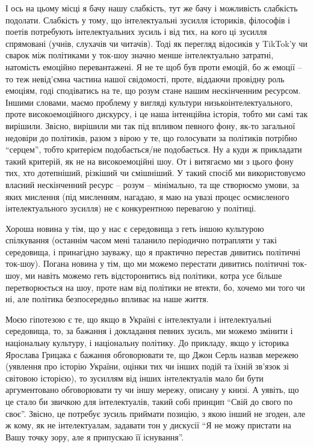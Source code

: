 І ось на цьому місці я бачу нашу слабкість, тут же бачу і можливість слабкість
подолати. Слабкість у тому, що інтелектуальні зусилля істориків, філософів і
поетів потребують інтелектуальних зусиль і від тих, на кого ці зусилля
спрямовані (учнів, слухачів чи читачів). Тоді як перегляд відосиків у TikTok'у
чи сварок між політиками у ток-шоу значно менше інтелектуально затратні,
натомість емоційно перевантажені. Я не те щоб був проти емоцій, бо ж емоції –
то теж невід’ємна частина нашої свідомості, проте, віддаючи провідну роль
емоціям, годі сподіватись на те, що розум стане нашим нескінченним ресурсом.
Іншими словами, маємо проблему у вигляді культури низькоінтелектуального, проте
високоемоційного дискурсу, і це наша інтенційна історія, тобто ми самі так
вирішили. Звісно, вирішили ми так під впливом певного фону, як-то загальної
недовіри до політиків, разом з вірою у те, що голосувати за політиків потрібно
\enquote{серцем}, тобто критерієм подобається/не подобається. Ну а куди ж прикладати
такий критерій, як не на високоемоційні шоу. От і витягаємо ми з цього фону
тих, хто дотепніший, різкіший чи смішніший. У такий спосіб ми використовуємо
власний нескінченний ресурс – розум – мінімально, та ще створюємо умови, за
яких мислення (під мисленням, нагадаю, я маю на увазі процес осмисленого
інтелектуального зусилля) не є конкурентною перевагою у політиці.

Хороша новина у тім, що у нас є середовища з геть іншою культурою спілкування
(останнім часом мені таланило періодично потрапляти у такі середовища, і
принагідно зауважу, що я практично перестав дивитись політичні ток-шоу). Погана
новина у тім, що ми можемо перестати дивитись політичні ток-шоу, ми навіть
можемо геть відсторонитись від політики, котра усе більше перетворюється на
шоу, проте нам від політики не втекти, бо, хочемо ми того чи ні, але політика
безпосередньо впливає на наше життя.

Моєю гіпотезою є те, що якщо в Україні є інтелектуали і інтелектуальні
середовища, то, за бажання і докладання певних зусиль, ми можемо змінити і
національну культуру, і національну політику. До прикладу, якщо у історика
Ярослава Грицака є бажання обговорювати те, що Джон Серль назвав мережею
(уявлення про історію України, оцінки тих чи інших подій та їхній зв’язок зі
світовою історією), то зусиллям від інших інтелектуалів мало би бути
аргументовано обговорювати ту чи іншу мережу, описану у книзі. А уявіть, що це
стало би звичкою для інтелектуалів, такий собі принцип \enquote{Свій до свого по своє}.
Звісно, це потребує зусиль приймати позицію, з якою інший не згоден, але ж
кому, як не інтелектуалам, задавати тон у дискусії \enquote{Я не можу пристати на Вашу
точку зору, але я припускаю її існування}.
